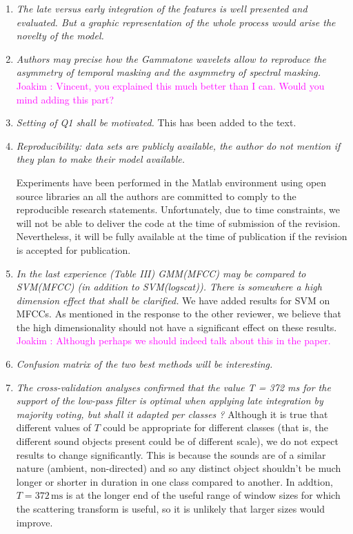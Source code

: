 \documentclass[10pt]{article}
\newcommand{\ja}[1]{\textcolor{magenta}{Joakim : #1}}
\begin{document}
\begin{enumerate}

\item \emph{The late versus early integration of the features is well presented and evaluated. But a graphic representation of the whole process would arise the novelty of the model.}

\item \emph{Authors may precise  how the Gammatone wavelets allow to reproduce the asymmetry of temporal masking and the asymmetry of spectral masking.}
\ja{Vincent, you explained this much better than I can. Would you mind adding this part?}

\item \emph{Setting of Q1 shall be motivated.}
This has been added to the text.

\item \emph{Reproducibility:  data sets are publicly available, the author do not mention if they plan to make their model available.}

Experiments have been performed in the Matlab environment using open source libraries an all the authors are committed to comply to the reproducible research statements. Unfortunately, due to time constraints, we will not be able to deliver the code at the time of submission of the revision. Nevertheless, it will be fully available at the time of publication if the revision is accepted for publication.

\item \emph{In the last experience (Table III) GMM(MFCC) may be compared to SVM(MFCC) (in addition to SVM(logscat)). There is somewhere a high dimension effect that shall be clarified.}
We have added results for SVM on MFCCs. As mentioned in the response to the other reviewer, we believe that the high dimensionality should not have a significant effect on these results. \ja{Although perhaps we should indeed talk about this in the paper.}

\item \emph{Confusion matrix of the two best methods will be interesting.}

\item \emph{The cross-validation analyses confirmed that the value T = 372 ms for the support of the low-pass filter is optimal when applying late integration by majority voting, but shall it adapted per classes  ?}
Although it is true that different values of $T$ could be appropriate for different classes (that is, the different sound objects present could be of different scale), we do not expect results to change significantly. This is because the sounds are of a similar nature (ambient, non-directed) and so any distinct object shouldn't be much longer or shorter in duration in one class compared to another. In addtion, $T = 372\,\mathrm{ms}$ is at the longer end of the useful range of window sizes for which the scattering transform is useful, so it is unlikely that larger sizes would improve.


\end{enumerate}
\end{document}
